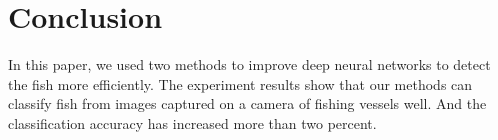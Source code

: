 \documentclass[conference]{IEEEtran}
\begin{document}
\section{Conclusion}

In this paper, we used two methods to improve deep neural networks to detect the fish more efficiently. The experiment results show that our methods can classify fish from images captured on a camera of fishing vessels well. And the classification accuracy has increased more than two percent.



%
%
%






\end{document}
